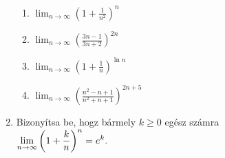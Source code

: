 \documentclass[a4paper, 12pt]{scrartcl}
\begin{document}
\begin{enumerate}
\begin{enumerate}
          \item $\displaystyle
                  \lim_{n \rightarrow \infty} \left(
                  1 + \frac{1}{n^2}
                  \right)^n
                $

          \item $\displaystyle
                  \lim_{n \rightarrow \infty} \left(
                  \frac{3n - 1}{3n + 2}
                  \right)^{2n}
                $

          \item $\displaystyle
                  \lim_{n \rightarrow \infty} \left(
                  1 + \frac{1}{n}
                  \right)^{\ln n}
                $

          \item $\displaystyle
                  \lim_{n \rightarrow \infty} \left(
                  \frac{n^2 - n + 1}{n^2 + n + 1}
                  \right)^{2n + 5}
                $
        \end{enumerate}

  \item Bizonyítsa be, hogz bármely $k \geq 0$ egész számra
        \\[3mm]
        $\displaystyle
          \lim_{n \rightarrow \infty} \left(
          1 + \frac{k}{n}
          \right)^n = e^k
          \text.
        $
\end{enumerate}

\end{document}
